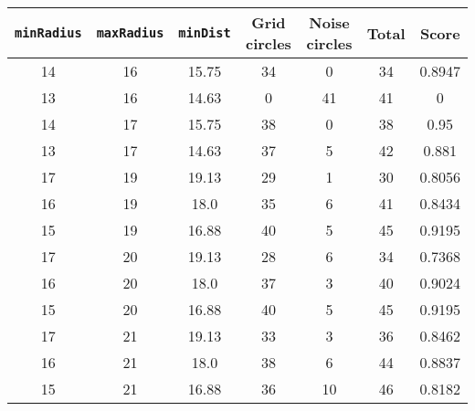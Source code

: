 \documentclass[letterpaper, 12pt]{article}
\begin{document}
\begin{longtable}{|c|c|c|c|c|c|c|}
\hline
\textbf{\texttt{minRadius}} & \textbf{\texttt{maxRadius}} & \textbf{\texttt{minDist}} & \textbf{Grid circles} & \textbf{Noise circles} & \textbf{Total} & \textbf{Score} \\
\hline
14 & 16 & 15.75 & 34 & 0 & 34 & 0.8947 \\
\hline
13 & 16 & 14.63 & 0 & 41 & 41 & 0 \\
\hline
14 & 17 & 15.75 & 38 & 0 & 38 & 0.95 \\
\hline
13 & 17 & 14.63 & 37 & 5 & 42 & 0.881 \\
\hline
17 & 19 & 19.13 & 29 & 1 & 30 & 0.8056 \\
\hline
16 & 19 & 18.0 & 35 & 6 & 41 & 0.8434 \\
\hline
15 & 19 & 16.88 & 40 & 5 & 45 & 0.9195 \\
\hline
17 & 20 & 19.13 & 28 & 6 & 34 & 0.7368 \\
\hline
16 & 20 & 18.0 & 37 & 3 & 40 & 0.9024 \\
\hline
15 & 20 & 16.88 & 40 & 5 & 45 & 0.9195 \\
\hline
17 & 21 & 19.13 & 33 & 3 & 36 & 0.8462 \\
\hline
16 & 21 & 18.0 & 38 & 6 & 44 & 0.8837 \\
\hline
15 & 21 & 16.88 & 36 & 10 & 46 & 0.8182 \\
\hline
\end{longtable}
\end{document}
